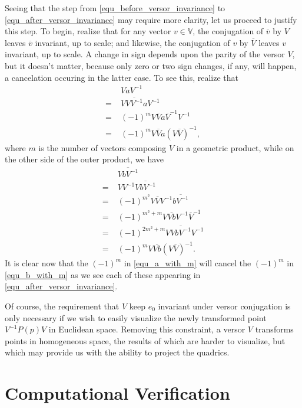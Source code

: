 \documentclass{birkjour}
\theoremstyle{definition}
\theoremstyle{remark}
\numberwithin{equation}{section}
\newcommand{\V}{\mathbb{V}}
\begin{document}
Seeing that the step from \eqref{equ_before_versor_invariance} to \eqref{equ_after_versor_invariance} may
require more clarity, let us proceed to justify this step.  To begin, realize
that for any vector $v\in\V$, the conjugation of $\overline{v}$ by $V$ leaves $\overline{v}$ invariant, up
to scale; and likewise, the conjugation of $v$ by $\overline{V}$ leaves $v$ invariant, up to scale.
A change in sign depends upon the parity of the versor $V$, but it doesn't matter,
because only zero or two sign changes, if any, will happen, a cancelation occuring in the latter case.
To see this, realize that
\begin{align}
 & VaV^{-1} \\
=\;& V\overline{VV^{-1}}aV^{-1} \\
=\;& (-1)^mV\overline{V}a\overline{V}^{-1}V^{-1} \\
=\;& (-1)^m V\overline{V}a(V\overline{V})^{-1},\label{equ_a_with_m}
\end{align}
where $m$ is the number of vectors composing $V$ in a geometric product,
while on the other side of the outer product, we have
\begin{align}
 & \overline{VbV^{-1}} \\
=\;& VV^{-1}\overline{VbV^{-1}} \\
=\;& (-1)^{m^2}V\overline{V}V^{-1}\overline{bV^{-1}} \\
=\;& (-1)^{m^2+m}V\overline{Vb}V^{-1}\overline{V}^{-1} \\
=\;& (-1)^{2m^2+m}V\overline{VbV^{-1}}V^{-1} \\
=\;& (-1)^m V\overline{Vb}(V\overline{V})^{-1}.\label{equ_b_with_m}
\end{align}
It is clear now that the $(-1)^m$ in \eqref{equ_a_with_m} will cancel the $(-1)^m$ in \eqref{equ_b_with_m}
as we see each of these appearing in \eqref{equ_after_versor_invariance}.

Of course, the requirement that $V$ keep $e_0$ invariant under versor conjugation is only necessary
if we wish to easily visualize the newly transformed point $V^{-1}P(p)V$ in Euclidean space.
Removing this constraint, a versor $V$ transforms points in homogeneous space, the results
of which are harder to visualize, but which may provide us with the ability to project the quadrics.

\section{Computational Verification}
\end{document}
